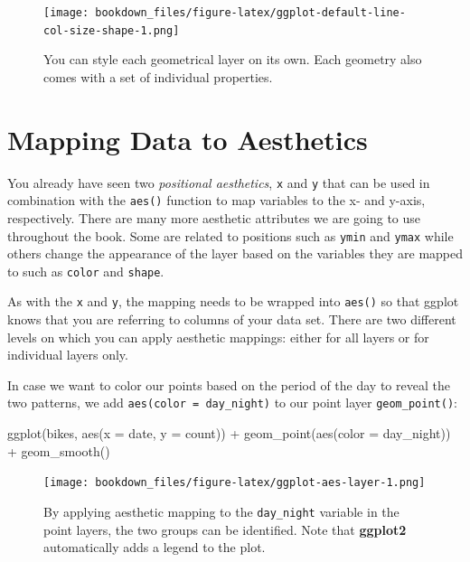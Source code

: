 \documentclass[
]{krantz}
\makeatletter
\newenvironment{Shaded}{\begin{snugshade}}{\end{snugshade}}
\newcommand{\AttributeTok}[1]{\textcolor[rgb]{0.61,0.61,0.61}{#1}}
\newcommand{\FunctionTok}[1]{\textcolor[rgb]{0,0,0}{#1}}
\newcommand{\NormalTok}[1]{#1}
\newcommand{\SpecialCharTok}[1]{\textcolor[rgb]{0,0,0}{#1}}
\newenvironment{kframe}{%
\medskip{}
\setlength{\fboxsep}{.8em}
 \def\at@end@of@kframe{}%
 \ifinner\ifhmode%
  \def\at@end@of@kframe{\end{minipage}}%
  \begin{minipage}{\columnwidth}%
 \fi\fi%
 \def\FrameCommand##1{\hskip\@totalleftmargin \hskip-\fboxsep
 \colorbox{shadecolor}{##1}\hskip-\fboxsep
     \hskip-\linewidth \hskip-\@totalleftmargin \hskip\columnwidth}%
 \MakeFramed {\advance\hsize-\width
   \@totalleftmargin\z@ \linewidth\hsize
   \@setminipage}}%
 {\par\unskip\endMakeFramed%
 \at@end@of@kframe}
\renewenvironment{Shaded}{\begin{kframe}}{\end{kframe}}
\makeatother
\begin{document}
\begin{figure}
\centering
\texttt{[image: bookdown\_files/figure-latex/ggplot-default-line-col-size-shape-1.png]}
\caption{\label{fig:ggplot-default-line-col-size-shape}You can style each geometrical layer on its own. Each geometry also comes with a set of individual properties.}
\end{figure}

\hypertarget{mapping-data-to-aesthetics}{%
\section{Mapping Data to Aesthetics}\label{mapping-data-to-aesthetics}}

You already have seen two \emph{positional aesthetics}, \texttt{x} and \texttt{y} that can be used in combination with the \texttt{aes()} function to map variables to the x- and y-axis, respectively. There are many more aesthetic attributes we are going to use throughout the book. Some are related to positions such as \texttt{ymin} and \texttt{ymax} while others change the appearance of the layer based on the variables they are mapped to such as \texttt{color} and \texttt{shape}.

As with the \texttt{x} and \texttt{y}, the mapping needs to be wrapped into \texttt{aes()} so that ggplot knows that you are referring to columns of your data set. There are two different levels on which you can apply aesthetic mappings: either for all layers or for individual layers only.

In case we want to color our points based on the period of the day to reveal the two patterns, we add \texttt{aes(color\ =\ day\_night)} to our point layer \texttt{geom\_point()}:

\begin{Shaded}
\begin{Highlighting}[]
\FunctionTok{ggplot}\NormalTok{(bikes, }\FunctionTok{aes}\NormalTok{(}\AttributeTok{x =}\NormalTok{ date, }\AttributeTok{y =}\NormalTok{ count)) }\SpecialCharTok{+} 
  \FunctionTok{geom\_point}\NormalTok{(}\FunctionTok{aes}\NormalTok{(}\AttributeTok{color =}\NormalTok{ day\_night)) }\SpecialCharTok{+}
  \FunctionTok{geom\_smooth}\NormalTok{()}
\end{Highlighting}
\end{Shaded}

\begin{figure}
\centering
\texttt{[image: bookdown\_files/figure-latex/ggplot-aes-layer-1.png]}
\caption{\label{fig:ggplot-aes-layer}By applying aesthetic mapping to the \texttt{day\_night} variable in the point layers, the two groups can be identified. Note that \textbf{ggplot2} automatically adds a legend to the plot.}
\end{figure}
\end{document}

